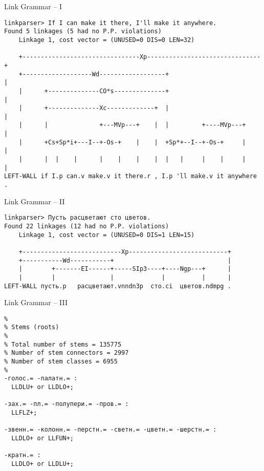 \documentclass{beamer}
\begin{document}
\begin{frame}[fragile]{Link Grammar -- I}
\begin{scriptsize}
\begin{verbatim}
linkparser> If I can make it there, I'll make it anywhere.
Found 5 linkages (5 had no P.P. violations)
	Linkage 1, cost vector = (UNUSED=0 DIS=0 LEN=32)

    +--------------------------------Xp-------------------------------+
    +-------------------Wd------------------+                         |
    |      +--------------CO*s--------------+                         |
    |      +--------------Xc-------------+  |                         |
    |      |              +---MVp---+    |  |         +----MVp---+    |
    |      +Cs+Sp*i+---I--+-Os-+    |    |  +Sp*+--I--+-Os-+     |    |
    |      |  |    |      |    |    |    |  |   |     |    |     |    |
LEFT-WALL if I.p can.v make.v it there.r , I.p 'll make.v it anywhere . 
\end{verbatim}
\end{scriptsize}
\end{frame}

\begin{frame}[fragile]{Link Grammar -- II}
\begin{scriptsize}
\begin{verbatim}
linkparser> Пусть расцветают сто цветов.                           
Found 22 linkages (12 had no P.P. violations)
	Linkage 1, cost vector = (UNUSED=0 DIS=1 LEN=15)

    +---------------------------Xp---------------------------+
    +-----------Wd-----------+                               |
    |        +-------EI------+-----SIp3----+----Ngp---+      |
    |        |               |             |          |      |
LEFT-WALL пусть.p   расцветают.vnndn3p  сто.ci  цветов.ndmpg . 
\end{verbatim}
\end{scriptsize}
\end{frame}

\begin{frame}[fragile]{Link Grammar -- III}
\begin{scriptsize}
\begin{verbatim}
%
% Stems (roots)
%
% Total number of stems = 135775
% Number of stem connectors = 2997
% Number of stem classes = 6955
%
-голос.= -палатн.= :
  LLDLU+ or LLDLO+;

-зах.= -пл.= -полупери.= -пров.= :
  LLFLZ+;

-звенн.= -колонн.= -перстн.= -светн.= -цветн.= -шерстн.= :
  LLDLO+ or LLFUN+;

-кратн.= :
  LLDLO+ or LLDLU+;
\end{verbatim}
\end{scriptsize}
\end{frame}
\end{document}
